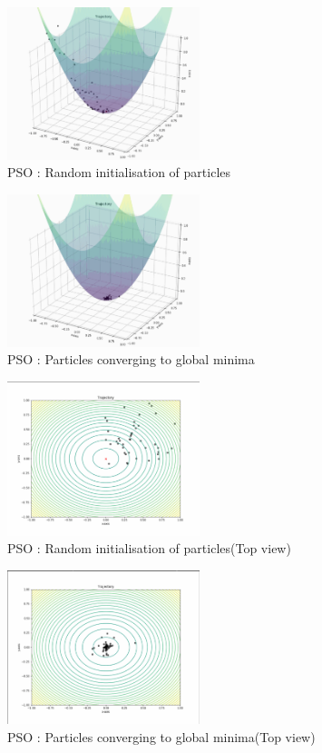 \newline \begin{figure}[H]
    \centering
    \includegraphics[width=0.5\textwidth]{images/pso3.png}
    \caption{PSO : Random initialisation of particles}
\end{figure}
\newline \begin{figure}[H]
    \centering
    \includegraphics[width=0.5\textwidth]{images/pso4.png}
    \caption{PSO : Particles converging to global minima}
\end{figure}
\newline \begin{figure}[H]
    \centering
    \includegraphics[width=0.5\textwidth]{images/pso1.png}
    \caption{PSO : Random initialisation of particles(Top view)}
\end{figure}
\newline \begin{figure}[H]
    \centering
    \includegraphics[width=0.5\textwidth]{images/pso2.png}
    \caption{PSO : Particles converging to global minima(Top view)}
\end{figure}

